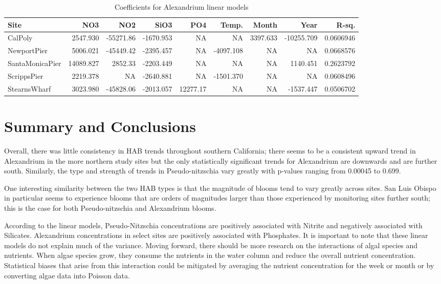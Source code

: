 \documentclass[
  12pt,
]{article}
\begin{document}
\begingroup\fontsize{9}{11}\selectfont

\begin{longtable}[t]{lrrrrrrrr}
\caption{\label{tab:LM Output Tables}Coefficients for Alexandrium linear models}\\
\toprule
Site & NO3 & NO2 & SiO3 & PO4 & Temp. & Month & Year & R-sq.\\
\midrule
CalPoly & 2547.930 & -55271.86 & -1670.953 & NA & NA & 3397.633 & -10255.709 & 0.0606946\\
NewportPier & 5006.021 & -45449.42 & -2395.457 & NA & -4097.108 & NA & NA & 0.0668576\\
SantaMonicaPier & 14089.827 & 2852.33 & -2203.449 & NA & NA & NA & 1140.451 & 0.2623792\\
ScrippsPier & 2219.378 & NA & -2640.881 & NA & -1501.370 & NA & NA & 0.0608496\\
StearnsWharf & 3023.980 & -45828.06 & -2013.057 & 12277.17 & NA & NA & -1537.447 & 0.0506702\\
\bottomrule
\end{longtable}
\endgroup{}

\newpage

\hypertarget{summary-and-conclusions}{%
\section{Summary and Conclusions}\label{summary-and-conclusions}}

Overall, there was little consistency in HAB trends throughout southern
California; there seems to be a consistent upward trend in Alexandrium
in the more northern study sites but the only statistically significant
trends for Alexandrium are downwards and are further south. Similarly,
the type and strength of trends in Pseudo-nitzschia vary greatly with
p-values ranging from 0.00045 to 0.699.

One interesting similarity between the two HAB types is that the
magnitude of blooms tend to vary greatly across sites. San Luis Obispo
in particular seems to experience blooms that are orders of magnitudes
larger than those experienced by monitoring sites further south; this is
the case for both Pseudo-nitzschia and Alexandrium blooms.

According to the linear models, Pseudo-Nitzschia concentrations are
positively associated with Nitrite and negatively associated with
Silicates. Alexandrium concentrations in select sites are positively
associated with Phosphates. It is important to note that these linear
models do not explain much of the variance. Moving forward, there should
be more research on the interactions of algal species and nutrients.
When algae species grow, they consume the nutrients in the water column
and reduce the overall nutrient concentration. Statistical biases that
arise from this interaction could be mitigated by averaging the nutrient
concentration for the week or month or by converting algae data into
Poisson data.
\end{document}
